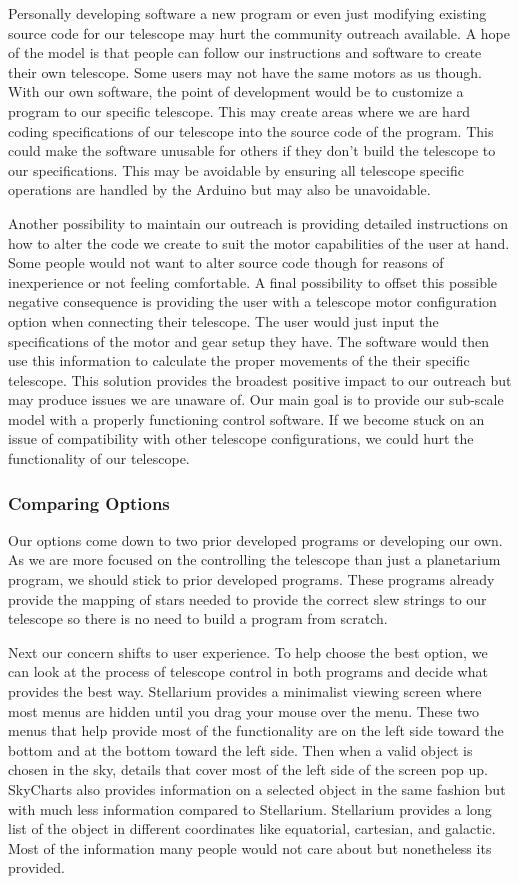 \documentclass[12pt]{report}
\begin{document}
Personally developing software a new program or even just modifying existing source code for our telescope may hurt the community outreach available. A hope of the model is that people can follow our instructions and software to create their own telescope. Some users may not have the same motors as us though. With our own software, the point of development would be to customize a program to our specific telescope. This may create areas where we are hard coding specifications of our telescope into the source code of the program. This could make the software unusable for others if they don’t build the telescope to our specifications. This may be avoidable by ensuring all telescope specific operations are handled by the Arduino but may also be unavoidable.

Another possibility to maintain our outreach is providing detailed instructions on how to alter the code we create to suit the motor capabilities of the user at hand. Some people would not want to alter source code though for reasons of inexperience or not feeling comfortable. A final possibility to offset this possible negative consequence is providing the user with a telescope motor configuration option when connecting their telescope. The user would just input the specifications of the motor and gear setup they have. The software would then use this information to calculate the proper movements of the their specific telescope. This solution provides the broadest positive impact to our outreach but may produce issues we are unaware of. Our main goal is to provide our sub-scale model with a properly functioning control software. If we become stuck on an issue of compatibility with other telescope configurations, we could hurt the functionality of our telescope.

\subsubsection*{Comparing Options}

Our options come down to two prior developed programs or developing our own. As we are more focused on the controlling the telescope than just a planetarium program, we should stick to prior developed programs. These programs already provide the mapping of stars needed to provide the correct slew strings to our telescope so there is no need to build a program from scratch.

Next our concern shifts to user experience. To help choose the best option, we can look at the process of telescope control in both programs and decide what provides the best way. Stellarium provides a minimalist viewing screen where most menus are hidden until you drag your mouse over the menu. These two menus that help provide most of the functionality are on the left side toward the bottom and at the bottom toward the left side. Then when a valid object is chosen in the sky, details that cover most of the left side of the screen pop up. SkyCharts also provides information on a selected object in the same fashion but with much less information compared to Stellarium. Stellarium provides a long list of the object in different coordinates like equatorial, cartesian, and galactic. Most of the information many people would not care about but nonetheless its provided.
\end{document}
